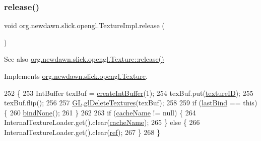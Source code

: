 \subsubsection{\texorpdfstring{release()}{release()}}
{\footnotesize\ttfamily void org.\+newdawn.\+slick.\+opengl.\+Texture\+Impl.\+release (\begin{DoxyParamCaption}{ }\end{DoxyParamCaption})\hspace{0.3cm}{\ttfamily [inline]}}

\begin{DoxySeeAlso}{See also}
\mbox{\hyperlink{interfaceorg_1_1newdawn_1_1slick_1_1opengl_1_1_texture_a57d72d7a615be1b481410739479989a6}{org.\+newdawn.\+slick.\+opengl.\+Texture\+::release()}} 
\end{DoxySeeAlso}


Implements \mbox{\hyperlink{interfaceorg_1_1newdawn_1_1slick_1_1opengl_1_1_texture_a57d72d7a615be1b481410739479989a6}{org.\+newdawn.\+slick.\+opengl.\+Texture}}.


\begin{DoxyCode}
252                           \{
253         IntBuffer texBuf = \mbox{\hyperlink{classorg_1_1newdawn_1_1slick_1_1opengl_1_1_texture_impl_af4a074ccdfc1a61d9ee75dc3430755ac}{createIntBuffer}}(1); 
254         texBuf.put(\mbox{\hyperlink{classorg_1_1newdawn_1_1slick_1_1opengl_1_1_texture_impl_a6dba48b815f4fc5a37e9c4390f349c9e}{textureID}});
255         texBuf.flip();
256         
257         \mbox{\hyperlink{classorg_1_1newdawn_1_1slick_1_1opengl_1_1_texture_impl_ad672b5a41ba59c882980c429c09b6572}{GL}}.\mbox{\hyperlink{interfaceorg_1_1newdawn_1_1slick_1_1opengl_1_1renderer_1_1_s_g_l_a763a5728906baa94182a81ed3bb52ca0}{glDeleteTextures}}(texBuf);
258         
259         \textcolor{keywordflow}{if} (\mbox{\hyperlink{classorg_1_1newdawn_1_1slick_1_1opengl_1_1_texture_impl_ae726e8066199fe500031c7058f3459c3}{lastBind}} == \textcolor{keyword}{this}) \{
260             \mbox{\hyperlink{classorg_1_1newdawn_1_1slick_1_1opengl_1_1_texture_impl_a868110ef047125f2e6d52f503cbc827b}{bindNone}}();
261         \}
262         
263         \textcolor{keywordflow}{if} (\mbox{\hyperlink{classorg_1_1newdawn_1_1slick_1_1opengl_1_1_texture_impl_a2b5b9b6700d8cc41e1bd79adbf2bf8fc}{cacheName}} != null) \{
264             InternalTextureLoader.get().clear(\mbox{\hyperlink{classorg_1_1newdawn_1_1slick_1_1opengl_1_1_texture_impl_a2b5b9b6700d8cc41e1bd79adbf2bf8fc}{cacheName}});
265         \} \textcolor{keywordflow}{else} \{
266             InternalTextureLoader.get().clear(\mbox{\hyperlink{classorg_1_1newdawn_1_1slick_1_1opengl_1_1_texture_impl_af482ec27b29b8846d98ce87bfcd88223}{ref}});
267         \}
268     \}
\end{DoxyCode}
\mbox{\label{classorg_1_1newdawn_1_1slick_1_1opengl_1_1_texture_impl_a4c68b84bd5fa52b6e780802ff12e995f}} 
